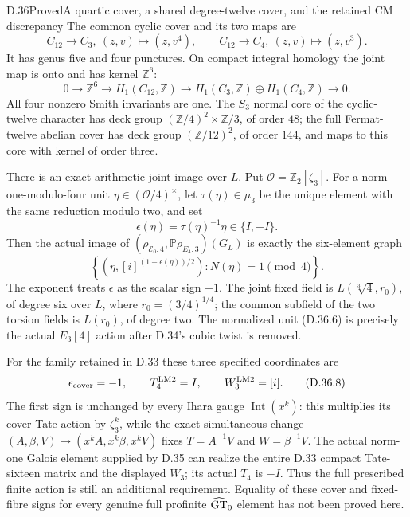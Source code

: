 \begin{statement}{D.36}{Proved}{A quartic cover, a shared degree-twelve cover, and the retained CM discrepancy}
The common cyclic cover and its two maps are
\[
 C_{12}\longrightarrow C_3,\ (z,v)\mapsto(z,v^4),
 \qquad
 C_{12}\longrightarrow C_4,\ (z,v)\mapsto(z,v^3).
                                                               \tag{D.36.4}
\]
It has genus five and four punctures. On compact integral homology
the joint map is onto and has kernel $\mathbb Z^6$:
\[
 0\longrightarrow\mathbb Z^6\longrightarrow
 H_1(C_{12},\mathbb Z)
 \longrightarrow H_1(C_3,\mathbb Z)\oplus H_1(C_4,\mathbb Z)
 \longrightarrow0.                                   \tag{D.36.5}
\]
All four nonzero Smith invariants are one. The $S_3$ normal core of
the cyclic-twelve character has deck group
$(\mathbb Z/4)^2\times\mathbb Z/3$, of order $48$; the full
Fermat-twelve abelian cover has deck group $(\mathbb Z/12)^2$,
of order $144$, and maps to this core with kernel of order three.

There is an exact arithmetic joint image over $L$. Put
$\mathcal O=\mathbb Z_2[\zeta_3]$. For a norm-one-modulo-four
unit $\eta\in(\mathcal O/4)^\times$, let $\tau(\eta)\in\mu_3$
be the unique element with the same reduction modulo two, and set
\[
 \epsilon(\eta)=\tau(\eta)^{-1}\eta\in\{I,-I\}.
                                                               \tag{D.36.6}
\]
Then the actual image of
$(\rho_{\mathcal E_0,4},\mathbb P\rho_{E_4,3})(G_L)$ is exactly
the six-element graph
\[
 \left\{\left(\eta,
 [i]^{(1-\epsilon(\eta))/2}\right):
 N(\eta)=1\pmod4\right\}.                            \tag{D.36.7}
\]
The exponent treats $\epsilon$ as the scalar sign $\pm1$.
The joint fixed field is
$L(\sqrt[3]{4},r_0)$, of degree six over $L$, where
$r_0=(3/4)^{1/4}$; the common subfield of the two torsion fields
is $L(r_0)$, of degree two. The normalized unit (D.36.6) is precisely the
actual $E_3[4]$ action after D.34's cubic twist is removed.

For the family retained in D.33 these three specified coordinates are
\[
 \epsilon_{\rm cover}=-1,\qquad
 T_4^{\rm LM2}=I,\qquad W_3^{\rm LM2}=[i].             \tag{D.36.8}
\]
The first sign is unchanged by every Ihara gauge
$\operatorname{Int}(x^k)$: this multiplies its cover Tate action by
$\zeta_3^k$, while the exact simultaneous change
$(A,\beta,V)\mapsto(x^kA,x^k\beta,x^kV)$ fixes
$T=A^{-1}V$ and $W=\beta^{-1}V$.
The actual norm-one Galois element supplied by D.35 can realize the
entire D.33 compact Tate-sixteen matrix and the displayed $W_3$;
its actual $T_4$ is $-I$. Thus the full prescribed finite action is
still an additional requirement. Equality of these cover and
fixed-fibre signs for every genuine full profinite
$\widehat{\rm GT}_0$ element has not been proved here.
\end{statement}
